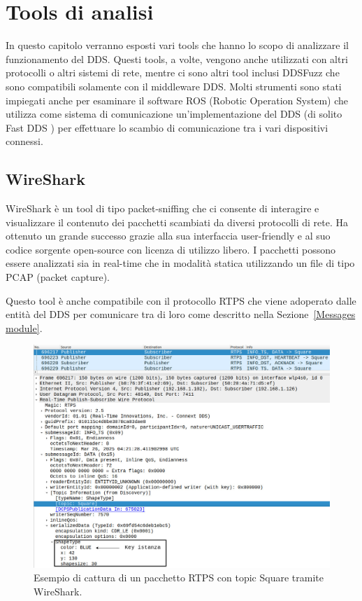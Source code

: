 \chapter{Tools di analisi}
\label{chtools}

In questo capitolo verranno esposti vari tools che hanno lo 
scopo di analizzare il funzionamento del DDS.
Questi tools,
a volte,
vengono anche utilizzati con altri protocolli o 
altri sistemi di rete, mentre ci sono altri tool inclusi DDSFuzz 
che sono compatibili solamente con il middleware DDS. Molti 
strumenti sono stati impiegati anche per esaminare il 
software ROS (Robotic Operation System) che utilizza come 
sistema di comunicazione un'implementazione del DDS 
(di solito Fast DDS \cite{FastDDS}) per effettuare lo scambio 
di comunicazione tra i vari dispositivi connessi.

\section{WireShark}
WireShark è un tool di tipo packet-sniffing che ci consente di 
interagire e visualizzare il contenuto dei pacchetti scambiati da 
diversi protocolli di rete. Ha ottenuto un grande successo 
grazie alla sua interfaccia user-friendly e al suo codice sorgente 
open-source con licenza di utilizzo libero. I pacchetti possono 
essere analizzati sia in real-time che in modalità statica utilizzando 
un file di tipo PCAP (packet capture). 

Questo tool è anche compatibile con il protocollo RTPS che viene
adoperato dalle entità del DDS per comunicare tra di loro 
come descritto nella Sezione~\ref{Messages module}.
\begin{figure}[H]
    \centering
    \includegraphics[width=15.2cm, keepaspectratio]{img/Info_ts e info_DST-Pagina-4.jpg}
    \caption{Esempio di cattura di un pacchetto RTPS con topic 
    Square tramite WireShark.}
    \label{wireskartshapesdemo}
\end{figure}

